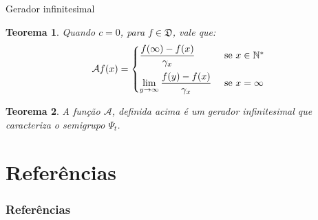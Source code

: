 \documentclass[xcolor=pdftex,dvipsnames]{beamer}
\newcommand{\AAA}{{\mathcal{A}}}
\newcommand{\DDD}{{\mathfrak{D}}}
\newcommand{\Nz}{{\mathbb{N^*}}}
\newtheorem{teorema}{Teorema}
\begin{document}
\begin{frame}{Gerador infinitesimal}

  \begin{teorema}
    Quando $c = 0$, para $f \in \DDD$, vale que:
    \begin{displaymath}
      \AAA f (x) = \begin{cases}
        \displaystyle
        \frac{f(\infty) - f(x)}{\gamma_x} & \text{ se } x \in \Nz \vspace{2mm}\\
        \displaystyle
        \lim_{y \to \infty} \frac{f(y) - f(x)}{\gamma_x} & \text{ se } x=\infty\\
      \end{cases}
    \end{displaymath}
  \end{teorema}
  \pause
  \begin{teorema}
    A função $\AAA$, definida acima é um gerador infinitesimal que
    caracteriza o semigrupo $\Psi_t$.
  \end{teorema}
\end{frame}



\section{Referências}
\begin{frame}
  \frametitle{Referências}
   
   
\end{frame}
\end{document}
